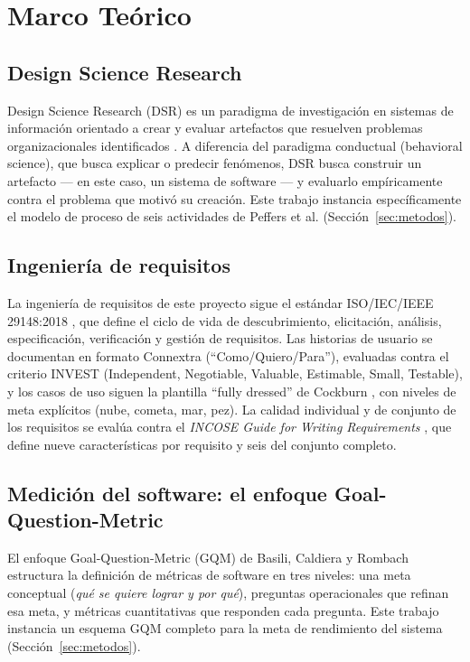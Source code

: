 \section{Marco Teórico}
\label{sec:marco-teorico}

\subsection{Design Science Research}

Design Science Research (DSR) es un paradigma de investigación en sistemas de información orientado a
crear y evaluar artefactos que resuelven problemas organizacionales identificados
\cite{hevner2004,peffers2007}. A diferencia del paradigma conductual (behavioral science), que busca
explicar o predecir fenómenos, DSR busca construir un artefacto --- en este caso, un sistema de software
--- y evaluarlo empíricamente contra el problema que motivó su creación. Este trabajo instancia
específicamente el modelo de proceso de seis actividades de Peffers et al. \cite{peffers2007}
(Sección~\ref{sec:metodos}).

\subsection{Ingeniería de requisitos}

La ingeniería de requisitos de este proyecto sigue el estándar ISO/IEC/IEEE 29148:2018
\cite{iso29148}, que define el ciclo de vida de descubrimiento, elicitación, análisis, especificación,
verificación y gestión de requisitos. Las historias de usuario se documentan en formato Connextra
(``Como/Quiero/Para''), evaluadas contra el criterio INVEST (Independent, Negotiable, Valuable,
Estimable, Small, Testable), y los casos de uso siguen la plantilla ``fully dressed'' de Cockburn
\cite{cockburn2001}, con niveles de meta explícitos (nube, cometa, mar, pez). La calidad individual y de
conjunto de los requisitos se evalúa contra el \textit{INCOSE Guide for Writing Requirements}
\cite{incose2023}, que define nueve características por requisito y seis del conjunto completo.

\subsection{Medición del software: el enfoque Goal-Question-Metric}

El enfoque Goal-Question-Metric (GQM) de Basili, Caldiera y Rombach \cite{basili1994} estructura la
definición de métricas de software en tres niveles: una meta conceptual (\textit{qué se quiere lograr y
por qué}), preguntas operacionales que refinan esa meta, y métricas cuantitativas que responden cada
pregunta. Este trabajo instancia un esquema GQM completo para la meta de rendimiento del sistema
(Sección~\ref{sec:metodos}).

